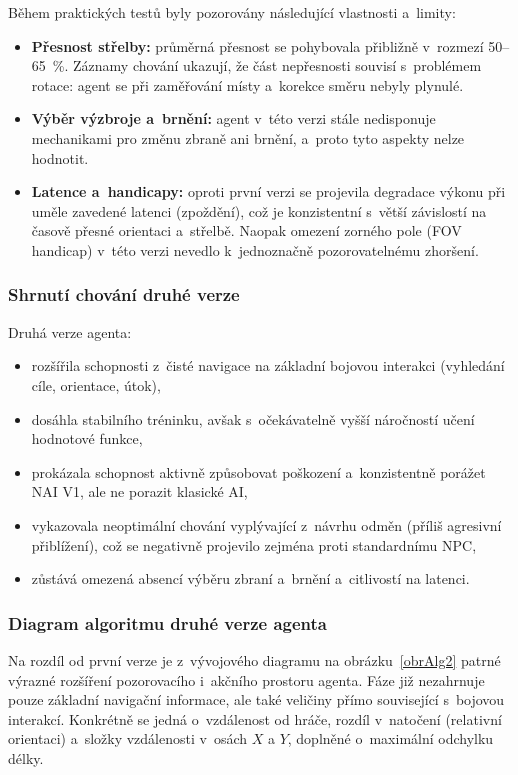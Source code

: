 Během praktických testů byly pozorovány následující vlastnosti a~limity:

\begin{itemize}
    \item \textbf{Přesnost střelby:} průměrná přesnost se pohybovala přibližně v~rozmezí 50--65~\%. Záznamy chování ukazují, že část nepřesnosti souvisí s~problémem rotace: agent se při zaměřování místy  a~korekce směru nebyly plynulé.
    \item \textbf{Výběr výzbroje a~brnění:} agent v~této verzi stále nedisponuje mechanikami pro změnu zbraně ani brnění, a~proto tyto aspekty nelze hodnotit.
    \item \textbf{Latence a~handicapy:} oproti první verzi se projevila degradace výkonu při uměle zavedené latenci (zpoždění), což je konzistentní s~větší závislostí na časově přesné orientaci a~střelbě. Naopak omezení zorného pole (FOV handicap) v~této verzi nevedlo k~jednoznačně pozorovatelnému zhoršení.
\end{itemize}

\subsubsection{Shrnutí chování druhé verze}

Druhá verze agenta:

\begin{itemize}
    \item rozšířila schopnosti z~čisté navigace na základní bojovou interakci (vyhledání cíle, orientace, útok),
    \item dosáhla stabilního tréninku, avšak s~očekávatelně vyšší náročností učení hodnotové funkce,
    \item prokázala schopnost aktivně způsobovat poškození a~konzistentně porážet NAI V1, ale ne porazit klasické AI,
    \item vykazovala neoptimální chování vyplývající z~návrhu odměn (příliš agresivní přiblížení), což se negativně projevilo zejména proti standardnímu NPC,
    \item zůstává omezená absencí výběru zbraní a~brnění a~citlivostí na latenci.
\end{itemize}

\subsubsection{Diagram algoritmu druhé verze agenta}

Na rozdíl od první verze je z~vývojového diagramu na obrázku~\ref{obrAlg2} patrné výrazné rozšíření pozorovacího i~akčního prostoru agenta. Fáze  již nezahrnuje pouze základní navigační informace, ale také veličiny přímo související s~bojovou interakcí. Konkrétně se jedná o~vzdálenost od hráče, rozdíl v~natočení (relativní orientaci) a~složky vzdálenosti v~osách $X$ a $Y$, doplněné o~maximální odchylku délky.

